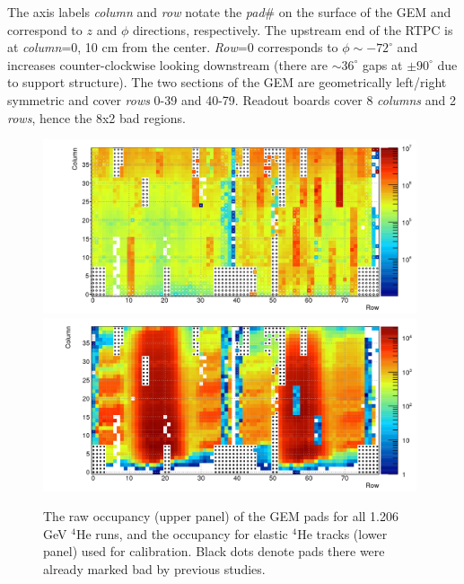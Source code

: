 \documentclass[amsmath,amssymb,notitlepage,12pt]{revtex4-1}
\begin{document}
The axis labels {\it column} and {\it row} notate the {\it pad}\# on the surface of the GEM and correspond to $z$ and $\phi$ directions, respectively.  The upstream end of the RTPC is at {\it column}=0, 10 cm from the center.  {\it Row}=0 corresponds to $\phi\sim -72^\circ$ and increases counter-clockwise looking downstream (there are $\sim36^\circ$ gaps at $\pm90^\circ$ due to support structure).  The two sections of the GEM are geometrically left/right symmetric and cover {\it rows} 0-39 and 40-79.  Readout boards cover 8 {\it columns} and 2 {\it rows}, hence the 8x2 bad regions.
\begin{figure}[htbp]\centering
    \includegraphics[width=11cm]{rawocc.png}
    \includegraphics[width=11cm]{c1_b61482.png}
    \caption{\label{fig:occ}The raw occupancy (upper panel) of the GEM pads for all 1.206 GeV $^4$He runs, and the occupancy for elastic $^4$He tracks (lower panel) used for calibration.  Black dots denote pads there were already marked bad by previous studies.}
\end{figure}
\end{document}
